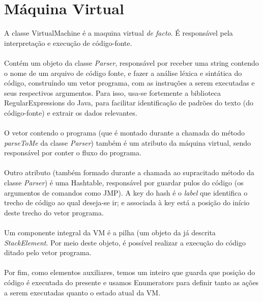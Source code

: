 \documentclass[a4paper]{article}
\begin{document}
\section{Máquina Virtual}
A classe VirtualMachine é a maquina virtual \textit{de facto}. É responsável pela interpretação e execução de código-fonte.\\\\
Contém um objeto da classe \textit{Parser}, responsável por receber uma string contendo o nome de um arquivo de código fonte, e fazer a análise léxica e sintática do código, construíndo um vetor programa, com as instruções a serem executadas e seus respectivos argumentos. Para isso, usa-se fortemente a biblioteca RegularExpressions do Java, para facilitar identificação de padrões do texto (do código-fonte) e extrair os dados relevantes.\\\\
O vetor contendo o programa (que é montado durante a chamada do método \textit{parseToMe} da classe \textit{Parser}) também é um atributo da máquina virtual, sendo responsável por conter o fluxo do programa.\\\\
Outro atributo (também formado durante a chamada ao supracitado método da classe \textit{Parser}) é uma Hashtable, responsável por guardar pulos do código (os argumentos de comandos como JMP). A key do hash é o \textit{label} que identifica o trecho de código ao qual deseja-se ir; e associada à key está a posição do início deste trecho do vetor programa.\\\\
Um componente integral da VM é a pilha (um objeto da já descrita \textit{StackElement}. Por meio deste objeto, é possível realizar a execução do código ditado pelo vetor programa.\\\\
Por fim, como elementos auxiliares, temos um inteiro que guarda que posição do código é executada do presente e usamos Enumerators para definir tanto as ações a serem executadas quanto o estado atual da VM.
\end{document}
